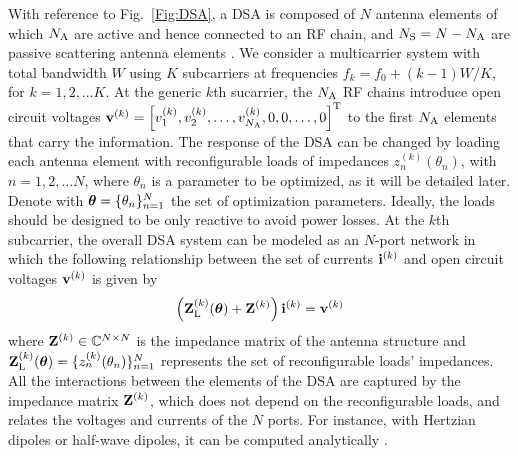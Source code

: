 \documentclass[10pt, final, twocolumn, twoside, romanappendices]{IEEEtran}
\begin{document}
With reference to Fig.~\ref{Fig:DSA}, a \ac{DSA} is composed of $N$ antenna elements of which $N_{\text{A}}$ are active and hence connected to an \ac{RF} chain, and $N_{\text{S}}=N-N_{\text{A}}$ are passive scattering antenna elements \cite{Dar:C24}. %
 We consider a multicarrier system with total bandwidth $W$ using $K$ subcarriers at frequencies $f_k=f_0+(k-1) W/K$, for $k=1,2, \ldots K$. At the generic $k$th sucarrier, the $N_{\text{A}}$ \ac{RF} chains introduce open circuit voltages ${{\bf{v}}^{(k)}=\left [v_1^{(k)}, v_2^{(k)}, \ldots, v_{N_{\text{A}}}^{(k)}, 0, 0, \ldots, 0 \right]^{{\mathrm{T}}}}$ to the first $N_{\text{A}}$ elements that carry the information. 
%
The response of the \ac{DSA} can be changed by loading each antenna element with reconfigurable loads of impedances $z_n^{(k)}(\theta_n)$, with $n=1,2, \ldots N$, where $\theta_n$ is a parameter to be optimized, as it will be detailed later. Denote with $\boldsymbol{\theta}=\{ \theta_n\}_{n=1}^N$ the set of optimization parameters.  
Ideally, the loads should be designed to be only reactive to avoid power losses. 
At the $k$th subcarrier, the overall \ac{DSA} system can be modeled as an $N$-port network in which the following relationship between the set of currents ${\bf{i}}^{(k)}$ and open circuit voltages ${\bf{v}}^{(k)}$ is given by
%
 \begin{align}
 \left ( {\bf{Z}}_{\text{L}}^{(k)}(\boldsymbol{\theta})  +{\bf{Z}}^{(k)}  \right ) {\bf{i}}^{(k)} ={\bf{v}}^{(k)}
\end{align}
%
where ${\bf{Z}}^{(k)} \in \mathbb{C}^{N \times N}$ is the impedance matrix of the  antenna structure and ${\bf{Z}}_{\text{L}}^{(k)}(\boldsymbol{\theta})=\{ z_n^{(k)}(\theta_n) \}_{n=1}^N $ represents the set of reconfigurable loads' impedances. All the interactions between the elements of the \ac{DSA} are captured by the impedance matrix ${\bf{Z}}^{(k)}$, which does not depend on the reconfigurable loads, and relates the voltages and currents of the $N$ ports. For instance, with Hertzian dipoles or half-wave dipoles, it can be computed analytically \cite{BalB:16}.
\end{document}
